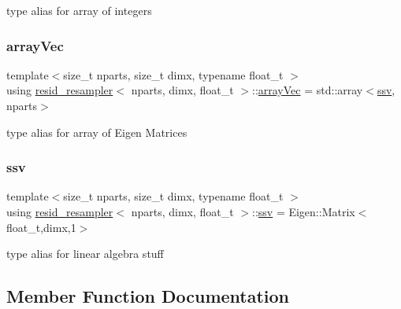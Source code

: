 type alias for array of integers \mbox{\label{classresid__resampler_a33ba5996cd3099fb81d9932bf5f460c0}} 
\subsubsection{\texorpdfstring{array\+Vec}{arrayVec}}
{\footnotesize\ttfamily template$<$size\+\_\+t nparts, size\+\_\+t dimx, typename float\+\_\+t $>$ \\
using \hyperlink{classresid__resampler}{resid\+\_\+resampler}$<$ nparts, dimx, float\+\_\+t $>$\+::\hyperlink{classrbase_aa12fc826befa6ba0647b5f59ebc396ee}{array\+Vec} =  std\+::array$<$\hyperlink{classrbase_ae20e0b8df15aa109252f57ecbf1f20f8}{ssv}, nparts$>$}

type alias for array of Eigen Matrices \mbox{\label{classresid__resampler_a500f44f0072a4d54b03762c946c38981}} 
\subsubsection{\texorpdfstring{ssv}{ssv}}
{\footnotesize\ttfamily template$<$size\+\_\+t nparts, size\+\_\+t dimx, typename float\+\_\+t $>$ \\
using \hyperlink{classresid__resampler}{resid\+\_\+resampler}$<$ nparts, dimx, float\+\_\+t $>$\+::\hyperlink{classrbase_ae20e0b8df15aa109252f57ecbf1f20f8}{ssv} =  Eigen\+::\+Matrix$<$float\+\_\+t,dimx,1$>$}

type alias for linear algebra stuff 

\subsection{Member Function Documentation}
\mbox{\label{classresid__resampler_ae6957cd1e080ac4313e6b0bc5ae9aa96}} 
